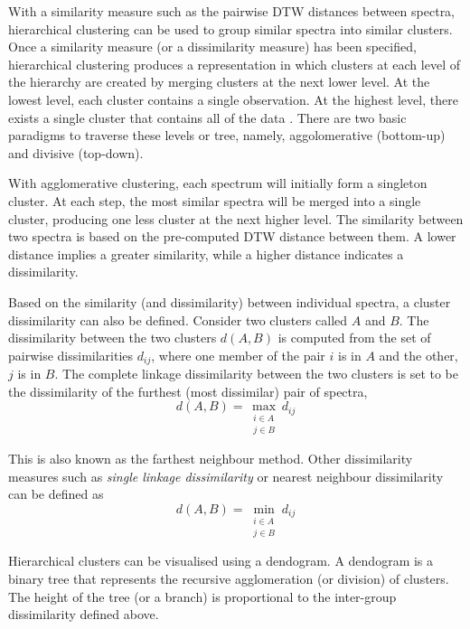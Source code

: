 With a similarity measure such as the pairwise DTW distances between spectra, hierarchical clustering can be used to group similar spectra into similar clusters. Once a similarity measure (or a dissimilarity measure) has been specified, hierarchical clustering produces a representation in which clusters at each level of the hierarchy are created by merging clusters at the next lower level. At the lowest level, each cluster contains a single observation. At the highest level, there exists a single cluster that contains all of the data \citep{hastie2009elements}. There are two basic paradigms to traverse these levels or tree, namely, aggolomerative (bottom-up) and divisive (top-down). 

With agglomerative clustering, each spectrum will initially form a singleton cluster. At each step, the most similar spectra will be merged into a single cluster, producing one less cluster at the next higher level. The similarity between two spectra is based on the pre-computed DTW distance between them. A lower distance implies a greater similarity, while a higher distance indicates a dissimilarity.  

Based on the similarity (and dissimilarity) between individual spectra, a cluster dissimilarity can also be defined. Consider two clusters called $A$ and $B$. The dissimilarity between the two clusters $d(A,B)$ is computed from the set of pairwise dissimilarities $d_{ij}$, where one member of the pair $i$ is in $A$ and the other, $j$ is in $B$. The complete linkage dissimilarity between the two clusters is set to be the dissimilarity of the furthest (most dissimilar) pair of spectra,
\begin{equation}
    d(A,B) = \max_{\substack{i \in A \\ j \in B}} d_{ij}
\end{equation}

This is also known as the farthest neighbour method. Other dissimilarity measures such as \emph{single linkage dissimilarity} or nearest neighbour dissimilarity can be defined as
\begin{equation}
    d(A,B) = \min_{\substack{i \in A \\ j \in B}} d_{ij}
\end{equation}

Hierarchical clusters can be visualised using a dendogram. A dendogram is a binary tree that represents the recursive agglomeration (or division) of clusters. The height of the tree (or a branch) is proportional to the inter-group dissimilarity defined above. 

